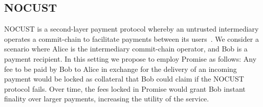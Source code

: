 \documentclass[runningheads]{llncs}
\newcommand{\sys}{Promise\xspace}
\begin{document}
\subsection{NOCUST}

NOCUST is a second-layer payment protocol whereby an untrusted intermediary operates a commit-chain to facilitate payments between its users~\cite{Khalil2019NOCUST}. We consider a scenario where Alice is the intermediary commit-chain operator, and Bob is a payment recipient. In this setting we propose to employ \sys as follows: Any fee to be paid by Bob to Alice in exchange for the delivery of an incoming payment would be locked as collateral that Bob could claim if the NOCUST protocol fails. Over time, the fees locked in \sys would grant Bob instant finality over larger payments, increasing the utility of the service.




\end{document}
